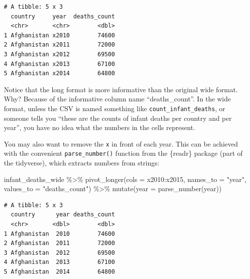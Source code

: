 \documentclass[
  letterpaper,
  DIV=11,
  numbers=noendperiod]{scrreprt}
\newenvironment{Shaded}{\begin{snugshade}}{\end{snugshade}}
\newcommand{\AttributeTok}[1]{\textcolor[rgb]{0.40,0.45,0.13}{#1}}
\newcommand{\FunctionTok}[1]{\textcolor[rgb]{0.28,0.35,0.67}{#1}}
\newcommand{\NormalTok}[1]{\textcolor[rgb]{0.00,0.23,0.31}{#1}}
\newcommand{\SpecialCharTok}[1]{\textcolor[rgb]{0.37,0.37,0.37}{#1}}
\newcommand{\StringTok}[1]{\textcolor[rgb]{0.13,0.47,0.30}{#1}}
\begin{document}
\begin{verbatim}
# A tibble: 5 x 3
  country     year  deaths_count
  <chr>       <chr>        <dbl>
1 Afghanistan x2010        74600
2 Afghanistan x2011        72000
3 Afghanistan x2012        69500
4 Afghanistan x2013        67100
5 Afghanistan x2014        64800
\end{verbatim}

\begin{tcolorbox}[enhanced jigsaw, title=\textcolor{quarto-callout-note-color}{\faInfo}\hspace{0.5em}{Side Note}, colbacktitle=quarto-callout-note-color!10!white, leftrule=.75mm, arc=.35mm, opacityback=0, bottomrule=.15mm, rightrule=.15mm, toptitle=1mm, breakable, toprule=.15mm, colback=white, coltitle=black, colframe=quarto-callout-note-color-frame, bottomtitle=1mm, titlerule=0mm, left=2mm, opacitybacktitle=0.6]

Notice that the long format is more informative than the original wide
format. Why? Because of the informative column name ``deaths\_count''.
In the wide format, unless the CSV is named something like
\texttt{count\_infant\_deaths}, or someone tells you ``these are the
counts of infant deaths per country and per year'', you have no idea
what the numbers in the cells represent.

\end{tcolorbox}

You may also want to remove the \texttt{x} in front of each year. This
can be achieved with the convenient \texttt{parse\_number()} function
from the \{readr\} package (part of the tidyverse), which extracts
numbers from strings:

\begin{Shaded}
\begin{Highlighting}[]
\NormalTok{infant\_deaths\_wide }\SpecialCharTok{\%\textgreater{}\%} 
  \FunctionTok{pivot\_longer}\NormalTok{(}\AttributeTok{cols =}\NormalTok{ x2010}\SpecialCharTok{:}\NormalTok{x2015,}
               \AttributeTok{names\_to =} \StringTok{"year"}\NormalTok{, }
               \AttributeTok{values\_to =} \StringTok{"deaths\_count"}\NormalTok{) }\SpecialCharTok{\%\textgreater{}\%} 
  \FunctionTok{mutate}\NormalTok{(}\AttributeTok{year =} \FunctionTok{parse\_number}\NormalTok{(year))}
\end{Highlighting}
\end{Shaded}

\begin{verbatim}
# A tibble: 5 x 3
  country      year deaths_count
  <chr>       <dbl>        <dbl>
1 Afghanistan  2010        74600
2 Afghanistan  2011        72000
3 Afghanistan  2012        69500
4 Afghanistan  2013        67100
5 Afghanistan  2014        64800
\end{verbatim}
\end{document}
